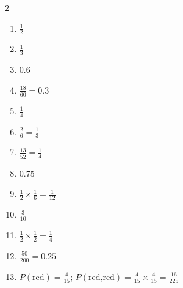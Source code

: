 \documentclass[11pt]{article}
\begin{document}
\begin{keybox}
\begin{multicols}{2}
\small
\begin{enumerate}[leftmargin=*,itemsep=3pt]
  \item $\tfrac12$
  \item $\tfrac13$
  \item $0.6$
  \item $\tfrac{18}{60}=0.3$
  \item $\tfrac14$
  \item $\tfrac26=\tfrac13$
  \item $\tfrac{13}{52}=\tfrac14$
  \item $0.75$
  \item $\tfrac12\times\tfrac16=\tfrac1{12}$
  \item $\tfrac{3}{10}$
  \item $\tfrac12\times\tfrac12=\tfrac14$
  \item $\tfrac{50}{200}=0.25$
  \item $P(\text{red})=\tfrac{4}{15}$; $P(\text{red,red})=\tfrac{4}{15}\times\tfrac{4}{15}=\tfrac{16}{225}$
\end{enumerate}
\end{multicols}
\end{keybox}
\end{document}
